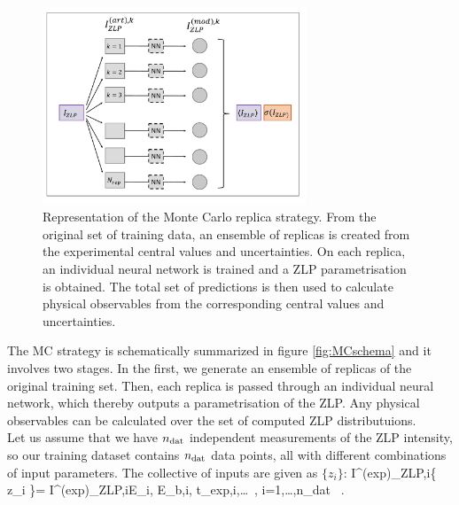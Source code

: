 \begin{figure}[h]
    \centering
    \includegraphics[width=0.7\textwidth]{plots/MCscheme.pdf}
    \caption{Representation of the Monte Carlo replica strategy. From the original set of training data,
    an ensemble of replicas is created from the experimental central values and uncertainties. 
    On each replica, an individual neural network is trained and a ZLP parametrisation is obtained.
    The total set of predictions is then used to calculate physical observables from the corresponding
    central values and uncertainties.}
    \label{fig:MCscheme}
\end{figure}

The MC strategy is schematically summarized in figure \ref{fig:MCschema} and it involves two stages.
In the first, we generate an ensemble of replicas of the original training set. 
%
Then, each replica
is passed through an individual neural network, which thereby outputs a parametrisation of the ZLP.
%
Any physical observables can be calculated over the set of computed ZLP distributuions.\\

Let us assume that we have $n_{\rm dat}$ independent measurements of the ZLP intensity, 
so our training dataset contains $n_{\rm dat}$ data points, all with different combinations of input parameters. 
%
The collective of inputs are given as $\{z_i\}$:
\be
I^{\rm (exp)}_{{\rm ZLP},i}\lp \{ z_i  \}\rp = I^{\rm (exp)}_{{\rm ZLP},i}\lp  \Delta E_i, E_{b,i}, t_{\rm exp,i},\ldots \rp
\,, \quad i=1,\ldots,n_{\rm dat} \, .
\ee

